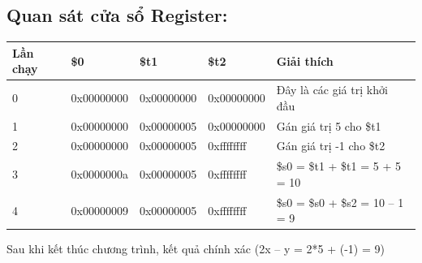 \documentclass[12pt,a4paper,oneside]{article}
\begin{document}
	\subsection{Quan sát cửa sổ Register:}
		\begin{center}
		\begin{tabular}{|l|l|l|l|l|}
		\hline 
		Lần chạy & \$0 & \$t1 & \$t2 & Giải thích	 \\ 
		\hline 
		0 & 0x00000000 & 0x00000000 & 0x00000000 & Đây là các giá trị khởi đầu \\ 
		\hline 
		1 & 0x00000000 & 0x00000005 & 0x00000000 & Gán giá trị 5 cho \$t1 \\ 
		\hline 
		2 & 0x00000000 & 0x00000005 & 0xffffffff & Gán giá trị -1 cho \$t2 \\ 
		\hline 
		3 & 0x0000000a & 0x00000005 & 0xffffffff & \$s0 = \$t1 + \$t1 = 5 + 5 = 10 \\ 
		\hline 
		4 & 0x00000009 & 0x00000005 & 0xffffffff & \$s0 = \$s0 + \$s2 = 10 – 1 = 9 \\ 
		\hline 
		\end{tabular} 
		\end{center}
		\quad Sau khi kết thúc chương trình, kết quả chính xác (2x – y = 2*5 + (-1) = 9) 
\end{document}
